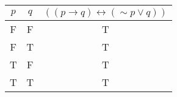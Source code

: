 \begin{tabular}{|c|c||c|}
\hline
$ p $ & $ q $ & $ ((p \rightarrow q) \leftrightarrow ( \sim p \vee q)) $ \\
\hline
F & F & T \\
F & T & T \\
T & F & T \\
T & T & T \\
\hline
\end{tabular}
\label{table:tt1}
